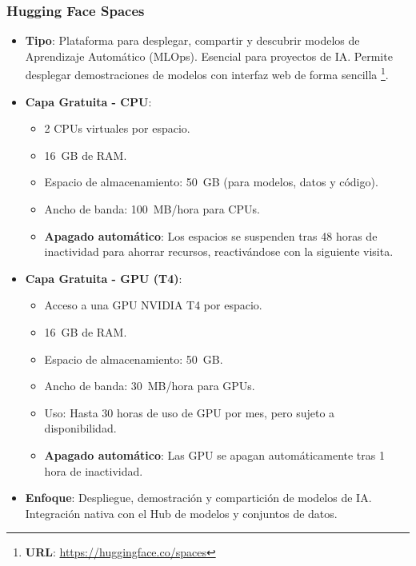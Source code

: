\subsubsection*{Hugging Face Spaces}
\begin{itemize}
	\item \textbf{Tipo}: Plataforma para desplegar, compartir y descubrir modelos de Aprendizaje Automático (MLOps). Esencial para proyectos de IA. Permite desplegar demostraciones de modelos con interfaz web de forma sencilla \footnote{\textbf{URL}: \url{https://huggingface.co/spaces}}.
	\item \textbf{Capa Gratuita - CPU}: 
	\begin{itemize}
		\item 2 CPUs virtuales por espacio.
		\item 16~GB de RAM.
		\item Espacio de almacenamiento: 50~GB (para modelos, datos y código).
		\item Ancho de banda: 100~MB/hora para CPUs.
		\item \textbf{Apagado automático}: Los espacios se suspenden tras 48 horas de inactividad para ahorrar recursos, reactivándose con la siguiente visita.
	\end{itemize}
	\item \textbf{Capa Gratuita - GPU (T4)}: 
	\begin{itemize}
		\item Acceso a una GPU NVIDIA T4 por espacio.
		\item 16~GB de RAM.
		\item Espacio de almacenamiento: 50~GB.
		\item Ancho de banda: 30~MB/hora para GPUs.
		\item Uso: Hasta 30 horas de uso de GPU por mes, pero sujeto a disponibilidad.
		\item \textbf{Apagado automático}: Las GPU se apagan automáticamente tras 1 hora de inactividad.
	\end{itemize}
	\item \textbf{Enfoque}: Despliegue, demostración y compartición de modelos de IA. Integración nativa con el Hub de modelos y conjuntos de datos.
\end{itemize}

